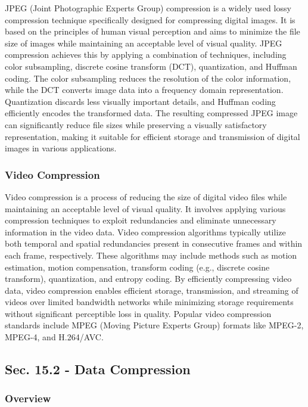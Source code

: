 JPEG (Joint Photographic Experts Group) compression is a widely used lossy compression technique specifically designed for compressing digital images. It is based on the principles of human visual 
perception and aims to minimize the file size of images while maintaining an acceptable level of visual quality. JPEG compression achieves this by applying a combination of techniques, including color 
subsampling, discrete cosine transform (DCT), quantization, and Huffman coding. The color subsampling reduces the resolution of the color information, while the DCT converts image data into a frequency 
domain representation. Quantization discards less visually important details, and Huffman coding efficiently encodes the transformed data. The resulting compressed JPEG image can significantly reduce 
file sizes while preserving a visually satisfactory representation, making it suitable for efficient storage and transmission of digital images in various applications.

\subsubsection{Video Compression}

Video compression is a process of reducing the size of digital video files while maintaining an acceptable level of visual quality. It involves applying various compression techniques to exploit 
redundancies and eliminate unnecessary information in the video data. Video compression algorithms typically utilize both temporal and spatial redundancies present in consecutive frames and within each 
frame, respectively. These algorithms may include methods such as motion estimation, motion compensation, transform coding (e.g., discrete cosine transform), quantization, and entropy coding. By efficiently 
compressing video data, video compression enables efficient storage, transmission, and streaming of videos over limited bandwidth networks while minimizing storage requirements without significant 
perceptible loss in quality. Popular video compression standards include MPEG (Moving Picture Experts Group) formats like MPEG-2, MPEG-4, and H.264/AVC.

\subsection*{Sec. 15.2 - Data Compression}

\subsubsection{Overview}

